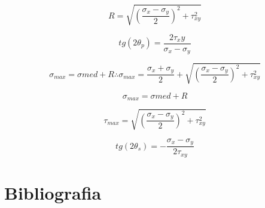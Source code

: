 \documentclass[a4paper]{article}
\begin{document}
\begin{equation}
	R =  \sqrt{(\frac{\sigma_x - \sigma_y}{2})^2 + \tau_{xy}^2}  
\end{equation}

\begin{equation}
	tg(2\theta_p) = \frac{2\tau_xy}{\sigma_x - \sigma_y}
\end{equation}

\begin{equation}
	\sigma_{max} = \sigma{med} + R \therefore \sigma_{max} = \frac{\sigma_x + \sigma_y}{2} + \sqrt{(\frac{\sigma_x - \sigma_y}{2})^2 + \tau_{xy}^2}
\end{equation}

\begin{equation}
	\sigma_{max} = \sigma{med} + R
\end{equation}

\begin{equation}
	\tau_{max} = \sqrt{(\frac{\sigma_x - \sigma_y}{2})^2 + \tau_{xy}^2}
\end{equation}

\begin{equation}
	tg(2\theta_s) = - \frac{\sigma_x - \sigma_y}{2\tau_{xy}}
\end{equation}


\section{Bibliografia}


\end{document}
